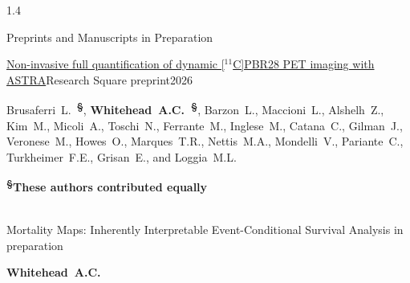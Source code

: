 \documentclass{cv}
\begin{document}
\begin{spacing}{1.4}
        \vspace{0.25cm}
        \begin{rSection}{Preprints and Manuscripts in Preparation}
            \vspace{-0.5cm}
            \item \begin{rSubsection}{\href{https://doi.org/10.21203/rs.3.rs-8895728/v1}{Non-invasive full quantification of dynamic [$^{11}$C]PBR28 PET imaging with ASTRA}}{}{Research Square preprint}{2026}
                \vspace{-0.25cm}
                \item Brusaferri~L.~\textbf{\textsuperscript{\S}}, \textbf{Whitehead~A.C.~\textsuperscript{\S}}, Barzon~L., Maccioni~L., Alshelh~Z., Kim~M., Micoli~A., Toschi~N., Ferrante~M., Inglese~M., Catana~C., Gilman~J., Veronese~M., Howes~O., Marques~T.R., Nettis~M.A., Mondelli~V., Pariante~C., Turkheimer~F.E., Grisan~E., and Loggia~M.L. \\
                \vspace{-0.25cm}
                \item \textbf{\textsuperscript{\S}These authors contributed equally} \\
                \\
            \end{rSubsection}

            \vspace{-0.5cm}
            \item \begin{rSubsection}{Mortality Maps: Inherently Interpretable Event-Conditional Survival Analysis}{}{ }{in preparation}
                \vspace{-0.25cm}
                \item \textbf{Whitehead~A.C.}
                \\
            \end{rSubsection}
        \end{rSection}
    \end{spacing}
\end{document}

